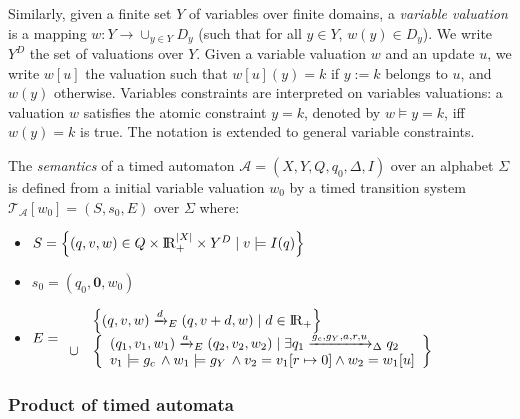 \documentclass[a4paper,10pt]{article}
\def\A{\ensuremath{\mathcal{A}}}
\def\T{\ensuremath{\mathcal{T}}}
\def\bbbr{{\rm I\!R }}
\begin{document}
Similarly,
given a finite set $Y$ of variables over finite domains,
a \emph{variable valuation} is a mapping $w : Y \to
\cup_{y \in Y} D_y$ (such that for all $y \in Y$, $w(y) \in D_y$).
We write $Y^D$ the set of valuations over $Y$.
Given a variable valuation $w$ and an update $u$, we write $w[u]$ the
valuation such that $w[u](y) = k$ if $y := k$ belongs to $u$, and
$w(y)$ otherwise.
Variables constraints are interpreted on variables valuations: a
valuation $w$ satisfies the atomic constraint $y=k$, denoted by
$w \models y=k$, iff $w(y) = k$ is true. The notation is
extended to general variable constraints. 



The \emph{semantics} of a timed automaton $\A=(X,Y,Q,q_0,\Delta,I)$
over an alphabet $\Sigma$ is defined from a initial variable valuation $w_0$
by a timed transition system
$\T_{\A}[w_0] = (S,s_0,E)$ over $\Sigma$ where:
\begin{itemize}
\item $S = \left \{ (q,v,w) \in Q \times \bbbr_{+}^{|X|}  \times
    Y^D \mid v \models I(q) \right \}$
\item $s_0 = (q_0,\mathbf{0},w_0)$
\item $E = \begin{array}{ll}
& \left \{ 
(q,v,w) \xrightarrow{d}_E (q,v+d,w) \mid d \in \bbbr_+ 
\right \} \\
\cup & 
\left \{ \begin{array}{l}
(q_1,v_1,w_1) \xrightarrow{a}_E (q_2,v_2,w_2) \mid  
\exists q_1 \xrightarrow{g_c,g_Y,a,r,u}_{\Delta} q_2 \\
v_1 \models g_c \, \land w_1 \models g_Y \, \land v_2 = v_1[r \mapsto
0] \land w_2 = w_1[u]
\end{array}
\right \}
\\
\end{array}$
\end{itemize}




\subsubsection*{Product of timed automata}
\end{document}
